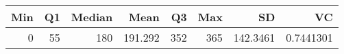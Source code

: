 
\begin{tabular}[t]{rrrrrrrr}
\toprule
Min & Q1 & Median & Mean & Q3 & Max & SD & VC\\
\midrule
0 & 55 & 180 & 191.292 & 352 & 365 & 142.3461 & 0.7441301\\
\bottomrule
\end{tabular}